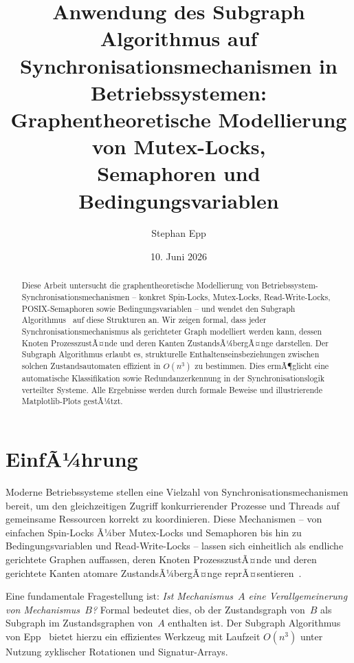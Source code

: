 ﻿\documentclass[a4paper,12pt]{article}
\title{Anwendung des Subgraph Algorithmus auf\\
Synchronisationsmechanismen in Betriebssystemen:\\
Graphentheoretische Modellierung von Mutex-Locks,\\
Semaphoren und Bedingungsvariablen}
\author{Stephan Epp}
\date{10. Juni 2026}
\theoremstyle{definition}
\begin{document}
\maketitle

\begin{abstract}
Diese Arbeit untersucht die graphentheoretische Modellierung von
Betriebssystem-Synchronisa\-tions\-me\-cha\-nis\-men -- konkret Spin-Locks,
Mutex-Locks, Read-Write-Locks, POSIX-Semaphoren sowie Bedingungsvariablen --
und wendet den Subgraph Algorithmus~\cite{epp2026subgraph} auf diese Strukturen
an. Wir zeigen formal, dass jeder Synchronisationsmechanismus als
gerichteter Graph modelliert werden kann, dessen Knoten
ProzesszustÃ¤nde und deren Kanten ZustandsÃ¼bergÃ¤nge darstellen.
Der Subgraph Algorithmus erlaubt es, strukturelle Enthaltenseins\-be\-zieh\-ungen
zwischen solchen Zustandsautomaten effizient in $O(n^{3})$ zu bestimmen.
Dies ermÃ¶glicht eine automatische Klassifikation sowie
Redundanz\-erkennung in der Synchronisationslogik verteilter Systeme.
Alle Ergebnisse werden durch formale Beweise und illustrierende
Matplotlib-Plots gestÃ¼tzt.
\end{abstract}

\tableofcontents
\newpage

\section{EinfÃ¼hrung}

Moderne Betriebssysteme stellen eine Vielzahl von Synchronisations\-mechanismen
bereit, um den gleichzeitigen Zugriff konkurrierender Prozesse und Threads
auf gemeinsame Ressourcen korrekt zu koordinieren.
Diese Mechanismen -- von einfachen Spin-Locks Ã¼ber Mutex-Locks und Semaphoren
bis hin zu Bedingungsvariablen und Read-Write-Locks -- lassen sich
einheitlich als endliche gerichtete Graphen auffassen, deren Knoten
ProzesszustÃ¤nde und deren gerichtete Kanten atomare ZustandsÃ¼bergÃ¤nge
reprÃ¤sentieren~\cite{tanenbaum2014modern,silberschatz2018os}.

Eine fundamentale Fragestellung ist: \emph{Ist Mechanismus~$A$ eine
Verallgemeinerung von Mechanismus~$B$?} Formal bedeutet dies, ob der
Zustandsgraph von~$B$ als Subgraph im Zustandsgraphen von~$A$ enthalten ist.
Der Subgraph Algorithmus von Epp~\cite{epp2026subgraph} bietet hierzu ein
effizientes Werkzeug mit Laufzeit $O(n^{3})$ unter Nutzung zyklischer
Rotationen und Signatur-Arrays.
\end{document}
